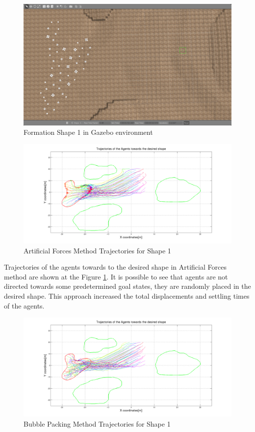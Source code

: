 \begin{figure}[H]
\caption{Formation Shape 1 in Gazebo environment}
\centerline{\includegraphics[scale = 0.32]{Trajectories_Formation_Shape_1_1}}
\end{figure} 	
		
\begin{figure}[H]
\caption{Artificial Forces Method Trajectories for Shape 1} \label{arto1}
\centerline{\includegraphics[scale = 0.32]{Aritificial_Trajecories_1}}
\end{figure} 	

Trajectories of the agents towards to the desired shape in Artificial Forces method are shown at the Figure \ref{arto1}. It is possible to see that agents are not directed towards some predetermined goal states, they are randomly placed in the desired shape. This approach increased the total displacements and settling times of the agents. 

\begin{figure}[H]
\caption{Bubble Packing Method Trajectories for Shape 1}
\centerline{\includegraphics[scale = 0.32]{Bubble_Trajectories_1}} \label{bubble1}
\end{figure} 	
		

